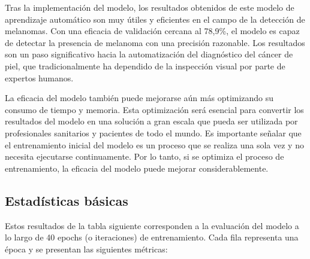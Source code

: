 Tras la implementación del modelo, los resultados obtenidos de este modelo de aprendizaje automático son muy útiles y eficientes en el campo de la detección de melanomas. Con una eficacia de validación cercana al 78,9\%, el modelo es capaz de detectar la presencia de melanoma con una precisión razonable. Los resultados son un paso significativo hacia la automatización del diagnóstico del cáncer de piel, que tradicionalmente ha dependido de la inspección visual por parte de expertos humanos.

La eficacia del modelo también puede mejorarse aún más optimizando su consumo de tiempo y memoria. Esta optimización será esencial para convertir los resultados del modelo en una solución a gran escala que pueda ser utilizada por profesionales sanitarios y pacientes de todo el mundo. Es importante señalar que el entrenamiento inicial del modelo es un proceso que se realiza una sola vez y no necesita ejecutarse continuamente. Por lo tanto, si se optimiza el proceso de entrenamiento, la eficacia del modelo puede mejorar considerablemente.

	\subsection{Estadísticas básicas}\label{sub:basic_statistics}
    
    Estos resultados de la tabla siguiente corresponden a la evaluación del modelo a lo largo de 40 epochs (o iteraciones) de entrenamiento. Cada fila representa una época y se presentan las siguientes métricas:
    
